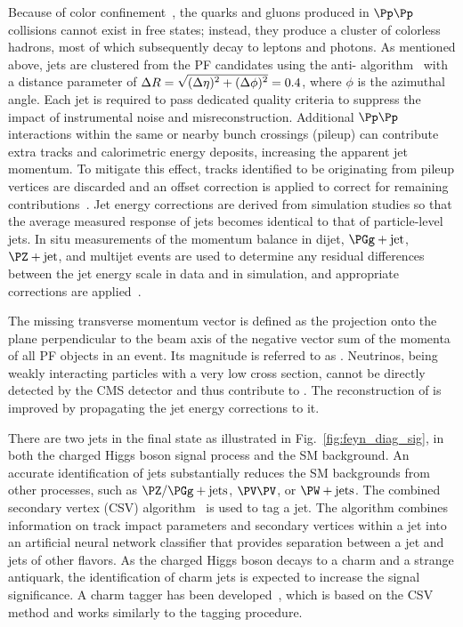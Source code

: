 Because of color confinement~\cite{Polyakov:1976fu}, the quarks and
gluons produced in $\Pp\Pp$ collisions cannot exist in free states; instead,
they produce a cluster of colorless hadrons, most of which
subsequently decay to leptons and photons. As mentioned above, jets
are clustered from the PF candidates using the anti-\kt
algorithm~\cite{Cacciari:2008gp,Cacciari:2011ma} with a distance
parameter of $\Delta R = \sqrt{\smash[b]{(\Delta\eta)^2 + (\Delta\phi)^2}} = 0.4$,
where $\phi$ is the azimuthal angle.
Each jet is required to pass dedicated quality criteria to suppress
the impact of instrumental noise and misreconstruction. Additional $\Pp\Pp$
interactions within the
same or nearby bunch crossings (pileup) can contribute extra tracks
and calorimetric energy deposits, increasing the apparent jet
momentum. To mitigate this effect, tracks identified to be originating
from pileup vertices are discarded and an offset correction is applied
to correct for remaining contributions~\cite{Sirunyan:2017ulk}. Jet
energy corrections are derived from simulation studies so that the
average measured response of jets becomes identical to that of
particle-level jets. In situ measurements of the momentum balance in
dijet, $\PGg+\text{jet}$, $\PZ+\text{jet}$, and multijet events are
used to determine any residual differences between the jet energy
scale in data and in simulation, and appropriate corrections are
applied~\cite{Khachatryan:2016kdb}.

The missing transverse momentum vector \ptvecmiss is defined as the
projection onto the plane perpendicular to the beam axis of
the negative vector sum of the momenta of all PF objects in an event.
Its magnitude is referred to as \ptmiss. Neutrinos, being weakly
interacting particles with a very low cross section, cannot be
directly detected by the CMS detector and thus contribute to \ptmiss.
The reconstruction of \ptmiss is improved by propagating the jet
energy corrections to it.

There are two \PQb jets in the final state as illustrated in
Fig.~\ref{fig:feyn_diag_sig}, in both the charged Higgs boson signal
process and the SM \ttbar background. An accurate
identification of \PQb jets substantially reduces the SM backgrounds
from other processes, such as $\PZ/\PGg + \text{jets}$, $\PV\PV$,
or $\PW + \text{jets}$. The combined secondary vertex (CSV)
algorithm~\cite{Sirunyan:2017ezt} is used to tag a \PQb jet. The
algorithm combines information on track impact parameters and
secondary vertices within a jet into an artificial neural network
classifier that provides separation between a \PQb jet and jets of
other flavors. As the charged Higgs boson decays to a charm and a
strange antiquark, the identification of charm jets is expected to
increase the signal significance. A charm tagger has been
developed~\cite{Sirunyan:2017ezt}, which is based on the CSV method
and works similarly to the \PQb tagging procedure.

